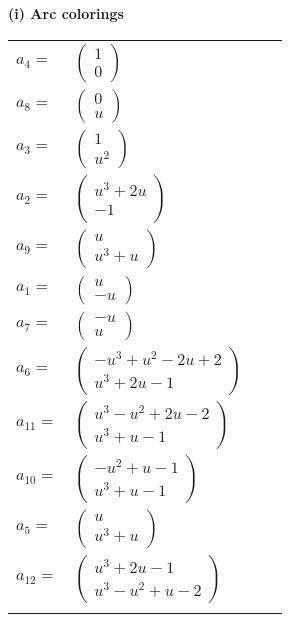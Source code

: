 \documentclass[1p]{elsarticle_modified}
\theoremstyle{definition}
\begin{document}
\flushleft \textbf{(i) Arc colorings}\\
\begin{tabular}{m{7pt} m{180pt} m{7pt} m{180pt} }
\flushright $a_{4}=$&$\begin{pmatrix}1\\0\end{pmatrix}$ \\
\flushright $a_{8}=$&$\begin{pmatrix}0\\u\end{pmatrix}$ \\
\flushright $a_{3}=$&$\begin{pmatrix}1\\u^2\end{pmatrix}$ \\
\flushright $a_{2}=$&$\begin{pmatrix}u^3+2 u\\-1\end{pmatrix}$ \\
\flushright $a_{9}=$&$\begin{pmatrix}u\\u^3+u\end{pmatrix}$ \\
\flushright $a_{1}=$&$\begin{pmatrix}u\\- u\end{pmatrix}$ \\
\flushright $a_{7}=$&$\begin{pmatrix}- u\\u\end{pmatrix}$ \\
\flushright $a_{6}=$&$\begin{pmatrix}- u^3+u^2-2 u+2\\u^3+2 u-1\end{pmatrix}$ \\
\flushright $a_{11}=$&$\begin{pmatrix}u^3- u^2+2 u-2\\u^3+u-1\end{pmatrix}$ \\
\flushright $a_{10}=$&$\begin{pmatrix}- u^2+u-1\\u^3+u-1\end{pmatrix}$ \\
\flushright $a_{5}=$&$\begin{pmatrix}u\\u^3+u\end{pmatrix}$ \\
\flushright $a_{12}=$&$\begin{pmatrix}u^3+2 u-1\\u^3- u^2+u-2\end{pmatrix}$\\&\end{tabular}
\end{document}
